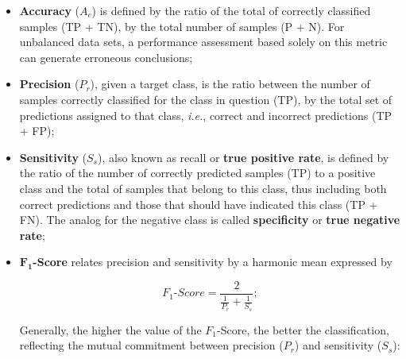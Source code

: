 \documentclass{ieeeaccess}
\begin{document}
\begin {itemize}
 \item\textbf{Accuracy} ($ A_c $) is defined by the ratio of the total of correctly classified samples (TP + TN), by the total number of samples (P + N). For unbalanced data sets, a performance assessment based solely on this metric can generate erroneous conclusions;
 
 \item\textbf{Precision} ($ P_r $), given a target class, is the ratio between the number of samples correctly classified for the class in question (TP), by the total set of predictions assigned to that class, \textit{i.e.}, correct and incorrect predictions (TP + FP);
 
 \item\textbf{Sensitivity} ($ S_s $), also known as recall or \textbf{true positive rate}, is defined by the ratio of the number of correctly predicted samples (TP) to a positive class and the total of samples that belong to this class, thus including both correct predictions and those that should have indicated this class (TP + FN). The analog for the negative class is called \textbf {specificity} or \textbf {true negative rate};
 
 \item\textbf {$\pmb{F_{1}} $-Score} relates precision and sensitivity by a harmonic mean expressed by
 
\begin{equation}
 F_{1}\text{-}Score = \frac {2} {\frac {1} {P_ {r}} + \frac {1} {S_ {s}}};
\end{equation}

 Generally, the higher the value of the $ F_ {1} $-Score, the better the classification, reflecting the mutual commitment between precision ($ P_r $) and sensitivity ($ S_s $):
\end{itemize}
\end{document}
